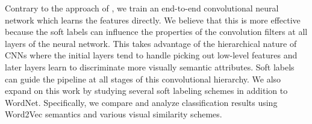Contrary to the approach of \cite{zhao2011large}, we train an end-to-end
convolutional neural network which learns the features directly.
We believe that this is more effective because the soft labels can influence
the properties of the convolution filters at all layers of the neural network.
This takes advantage of the hierarchical nature of CNNs where the initial
layers tend to handle picking out low-level features and later layers learn to
discriminate more visually semantic attributes. Soft labels can guide the
pipeline at all stages of this convolutional hierarchy.
We also expand on this work by studying several soft labeling schemes in
addition to WordNet. Specifically, we compare and analyze classification
results using Word2Vec semantics and various visual similarity schemes.
